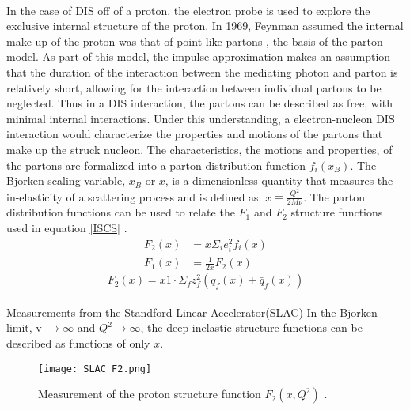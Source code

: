 \paragraph{}In the case of DIS off of a proton, the electron probe is used to explore the exclusive internal structure of the proton. In 1969, Feynman assumed the internal make up of the proton was that of point-like partons \cite{Briskin_thesis,DISproton}, the basis of the parton model. As part of this model, the impulse approximation makes an assumption that the duration of the interaction between the mediating photon and parton is relatively short, allowing for the interaction between individual partons to be neglected. Thus in a DIS interaction, the partons can be described as free, with minimal internal interactions. Under this understanding, a electron-nucleon DIS interaction would characterize the properties and motions of the partons that make up the struck nucleon\cite{DISproton}. The characteristics, the motions and properties, of the partons are formalized into a parton distribution function $f_i(x_B)$. The Bjorken scaling variable, $x_B$ or $x$, is a dimensionless quantity that measures the in-elasticity of a scattering process and is defined as: $x \equiv \frac{Q^2}{2M\nu}$. The parton distribution functions can be used to relate the $F_1$ and $F_2$ structure functions used in equation \ref{ISCS} \cite{PnN}. 
\begin{align}
	\label{PDFs}
	F_2(x) &= x \Sigma_i e^2_i f_i(x)\\
	F_1(x) &= \frac{1}{2x} F_2(x) \nonumber
\end{align}
\begin{equation}
\label{F2q}
F_2(x) = x1 \cdot \Sigma_f z^2_f ( q_f(x) + \bar{q}_f(x))
\end{equation}

\paragraph{} Measurements from the Standford Linear Accelerator(SLAC) 
 In the Bjorken limit, v $\rightarrow \infty$ and $Q^2 \rightarrow \infty$, the deep inelastic structure functions can be described as functions of only $x$.

\begin{figure}[H]
	\centering
	\texttt{[image: SLAC\_F2.png]} 
	\caption{ Measurement of the proton structure function $F_2(x, Q^2)$\cite{ref:rev_pp} .}
	\label{F2_fig}
\end{figure} 


